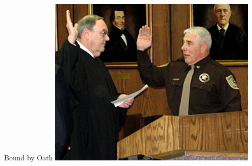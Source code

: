 \begin{frame}{Bound by Oath}
    \centering
    \includegraphics[width=0.75\textwidth]{img/sheriff-oath.png} \\
\end{frame}

